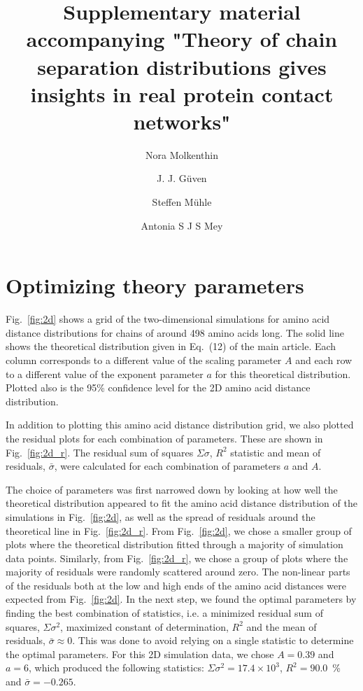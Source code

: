 \documentclass[notitlepage,
reprint,%
onecolumn,
amsmath,amssymb,superscriptaddress,aps,
pre]{revtex4-1}
\begin{document}
\title{Supplementary material accompanying "Theory of chain separation distributions gives insights in real protein contact networks"}
\author{Nora Molkenthin}
\author{J. J.  Güven}
\author{Steffen Mühle}
\author{Antonia S J S Mey}
\maketitle

\section*{Optimizing theory parameters}

 Fig.~\ref{fig:2d} shows a grid of the two-dimensional simulations for amino acid distance distributions for chains of around 498 amino acids long. The solid line shows the theoretical distribution given in Eq.~(12) of the main article. Each column corresponds to a different value of the scaling parameter $A$ and each row to a different value of the exponent parameter $a$ for this theoretical distribution. Plotted also is the 95\% confidence level for the 2D amino acid distance distribution. 

In addition to plotting this amino acid distance distribution grid, we also plotted the residual plots for each combination of parameters. These are shown in Fig.~\ref{fig:2d_r}. The residual sum of squares $\Sigma \sigma$, $R^2$ statistic and mean of residuals, $\bar{\sigma}$, were calculated for each combination of parameters $a$ and $A$. 

The choice of parameters was first narrowed down by looking at how well the theoretical distribution appeared to fit the amino acid distance distribution of the simulations in Fig.~\ref{fig:2d}, as well as the spread of residuals around the theoretical line in Fig.~\ref{fig:2d_r}. From Fig.~\ref{fig:2d}, we chose a smaller group of plots where the theoretical distribution fitted through a majority of simulation data points. Similarly, from Fig.~\ref{fig:2d_r}, we chose a group of plots where the majority of residuals were randomly scattered around zero. The non-linear parts of the residuals both at the low and high ends of the amino acid distances were expected from Fig.~\ref{fig:2d}. In the next step, we found the optimal parameters by finding the best combination of statistics, i.e. a minimized residual sum of squares, $\Sigma \sigma^2$, maximized constant of determination, $R^2$ and the mean of residuals, $\bar{\sigma} \approx 0$. This was done to avoid relying on a single statistic to determine the optimal parameters. For this 2D simulation data, we chose $A=0.39$ and $a=6$, which produced the following statistics: $\Sigma \sigma^2 = 17.4\times10^3$, $R^2 = 90.0$~\% and $\bar{\sigma} = -0.265$.
\end{document}
